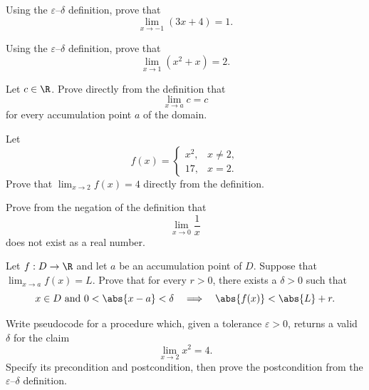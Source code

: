 
\begin{exercise}\label{ex:calc-1}
Using the $\varepsilon$--$\delta$ definition, prove that
\[\lim_{x\to -1}(3x+4)=1.\]
\end{exercise}

\begin{exercise}\label{ex:calc-2}
Using the $\varepsilon$--$\delta$ definition, prove that
\[\lim_{x\to 1}(x^2+x)=2.\]
\end{exercise}

\begin{exercise}\label{ex:calc-3}
Let $c\in\R$.  Prove directly from the definition that
\[\lim_{x\to a}c=c\]
for every accumulation point $a$ of the domain.
\end{exercise}

\begin{exercise}\label{ex:calc-4}
Let
\[
 f(x)=\begin{cases}
  x^2, & x\ne 2,\\
  17, & x=2.
 \end{cases}
\]
Prove that $\lim_{x\to2}f(x)=4$ directly from the definition.
\end{exercise}

\begin{exercise}\label{ex:calc-5}
Prove from the negation of the definition that
\[\lim_{x\to0}\frac{1}{x}\]
does not exist as a real number.
\end{exercise}

\begin{exercise}\label{ex:calc-6}
Let $f:D\to\R$ and let $a$ be an accumulation point of $D$.  Suppose that
$\lim_{x\to a}f(x)=L$.  Prove that for every $r>0$, there exists a
$\delta>0$ such that
\[
  x\in D\text{ and }0<\abs{x-a}<\delta
  \quad\Longrightarrow\quad \abs{f(x)}<\abs{L}+r.
\]
\end{exercise}

\begin{exercise}\label{ex:calc-7}
Write pseudocode for a procedure which, given a tolerance $\varepsilon>0$,
returns a valid $\delta$ for the claim
\[\lim_{x\to2}x^2=4.\]
Specify its precondition and postcondition, then prove the postcondition from
the $\varepsilon$--$\delta$ definition.
\end{exercise}

